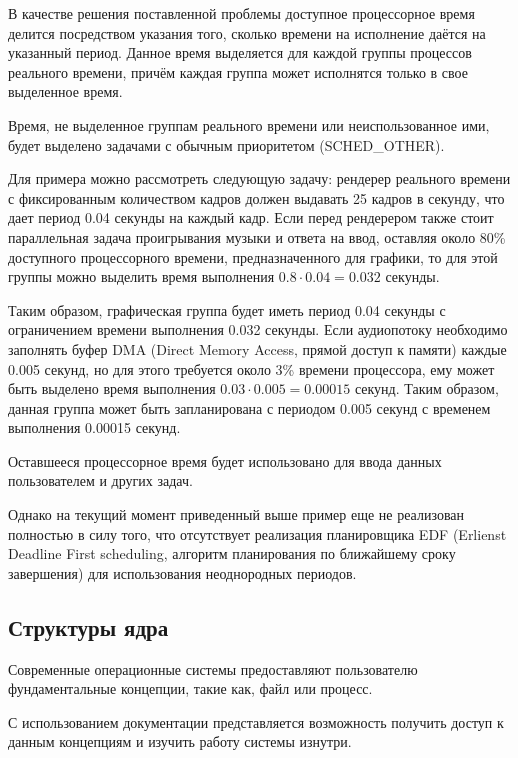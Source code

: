 В качестве решения поставленной проблемы доступное процессорное время делится посредством указания того, сколько времени на исполнение даётся на указанный период. Данное время выделяется для каждой группы процессов реального времени, причём каждая группа может исполнятся только в свое выделенное время. \cite{linuxkerneldocs}

Время, не выделенное группам реального времени или неиспользованное ими, будет выделено задачами с обычным приоритетом (SCHED\_OTHER). \cite{linuxkerneldocs}

Для примера можно рассмотреть следующую задачу: рендерер реального времени с фиксированным количеством кадров должен выдавать 25 кадров в секунду, что дает период 0.04 секунды на каждый кадр. Если перед рендерером также стоит параллельная задача проигрывания музыки и ответа на ввод, оставляя около 80\% доступного процессорного времени, предназначенного для графики, то для этой группы можно выделить время выполнения $ 0.8 \cdot 0.04 = 0.032 $ секунды.

Таким образом, графическая группа будет иметь период 0.04 секунды с ограничением времени выполнения 0.032 секунды. Если аудиопотоку необходимо заполнять буфер DMA (Direct Memory Access, прямой доступ к памяти) каждые 0.005 секунд, но для этого требуется около 3\% времени процессора, ему может быть выделено время выполнения $ 0.03 \cdot 0.005 = 0.00015 $ секунд. Таким образом, данная группа может быть запланирована с периодом 0.005 секунд с временем выполнения 0.00015 секунд.

Оставшееся процессорное время будет использовано для ввода данных пользователем и других задач.

Однако на текущий момент приведенный выше пример еще не реализован полностью в силу того, что отсутствует реализация планировщика EDF (Erlienst Deadline First scheduling, алгоритм планирования по ближайшему сроку завершения) для использования неоднородных периодов. \cite{linuxkerneldocs}

\subsection{Структуры ядра}
Современные операционные системы предоставляют пользователю фундаментальные концепции, такие как, файл или процесс. \cite{linuxTasks}

С использованием документации представляется возможность получить доступ к данным концепциям и изучить работу системы изнутри.

